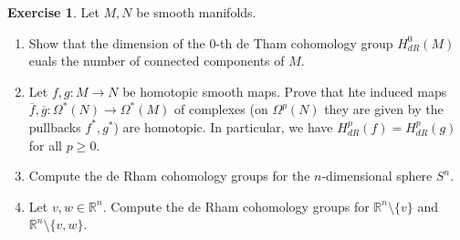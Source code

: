 \documentclass[a4paper,12pt]{article}
\theoremstyle{definition}
\newtheorem{exercise}{Exercise}
\begin{document}
\begin{exercise}
Let $M, N$ be smooth manifolds. 
\begin{enumerate}[label = (\alph*)]
    \item Show that the dimension of the 0-th de Tham cohomology group $H^0_{dR}(M)$ euals the number of connected components of $M$. 
    \item Let $f, g \colon M \to N$ be homotopic smooth maps. Prove that hte induced maps $\overline{f}, \overline{g} \colon \Omega^*(N) \to \Omega^*(M)$ of complexes (on $\Omega^p(N)$ they are given by the pullbacks $f^*, g^*$) are homotopic. In particular, we have $H_{dR}^p(f) = H^p_{dR}(g)$ for all $p \geq 0$. 
    \item Compute the de Rham cohomology groups for the $n$-dimensional sphere $S^n$. 
    \item Let $v, w \in \mathbb{R}^n$. Compute the de Rham cohomology groups for $\mathbb{R}^n \setminus \{v\}$ and $\mathbb{R}^n \setminus \{v, w\}$. 
\end{enumerate}
\end{exercise}
\end{document}
